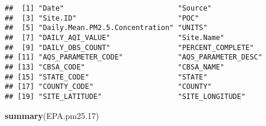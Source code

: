 \documentclass[]{article}
\newenvironment{Shaded}{\begin{snugshade}}{\end{snugshade}}
\newcommand{\KeywordTok}[1]{\textcolor[rgb]{0.13,0.29,0.53}{\textbf{#1}}}
\newcommand{\DecValTok}[1]{\textcolor[rgb]{0.00,0.00,0.81}{#1}}
\newcommand{\NormalTok}[1]{#1}
\begin{document}
\begin{verbatim}
##  [1] "Date"                           "Source"                        
##  [3] "Site.ID"                        "POC"                           
##  [5] "Daily.Mean.PM2.5.Concentration" "UNITS"                         
##  [7] "DAILY_AQI_VALUE"                "Site.Name"                     
##  [9] "DAILY_OBS_COUNT"                "PERCENT_COMPLETE"              
## [11] "AQS_PARAMETER_CODE"             "AQS_PARAMETER_DESC"            
## [13] "CBSA_CODE"                      "CBSA_NAME"                     
## [15] "STATE_CODE"                     "STATE"                         
## [17] "COUNTY_CODE"                    "COUNTY"                        
## [19] "SITE_LATITUDE"                  "SITE_LONGITUDE"
\end{verbatim}

\begin{Shaded}
\begin{Highlighting}[]
\KeywordTok{summary}\NormalTok{(EPA.pm25.}\DecValTok{17}\NormalTok{)}
\end{Highlighting}
\end{Shaded}
\end{document}
